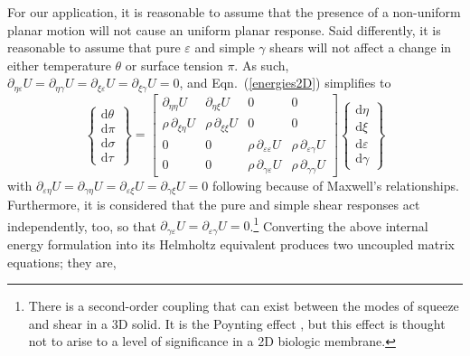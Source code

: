 For our application, it is reasonable to assume that the presence of a non-uniform planar motion will not cause an uniform planar response.  Said differently, it is reasonable to assume that pure $\varepsilon$ and simple $\gamma$ shears will not affect a change in either temperature $\theta$ or surface tension $\pi$.  As such, $\partial_{\eta\varepsilon} U = \partial_{\eta\gamma} U = \partial_{\xi\varepsilon} U = \partial_{\xi\gamma} U = 0$, and Eqn.~(\ref{energies2D}) simplifies to
\begin{displaymath}
\left\{ \begin{matrix}
\mathrm{d} \theta \\ \mathrm{d} \pi \\
\mathrm{d} \sigma \\ \mathrm{d} \tau
\end{matrix} \right\} = \begin{bmatrix}
\partial_{\eta\eta} U & 
\partial_{\eta\xi} U & 
0 & 0 \\ 
\rho \, \partial_{\xi\eta} U & 
\rho \, \partial_{\xi\xi} U & 
0 & 0 \\
0 & 0 & 
\rho \, \partial_{\varepsilon\varepsilon} U & 
\rho \, \partial_{\varepsilon\gamma} U \\
0 & 0 & 
\rho \, \partial_{\gamma\varepsilon} U & 
\rho \, \partial_{\gamma\gamma} U 
\end{bmatrix} 
\left\{ \begin{matrix}
\mathrm{d}\eta \\ \mathrm{d} \xi \\
\mathrm{d} \varepsilon \\ \mathrm{d} \gamma
\end{matrix} \right\} 
\end{displaymath}
with $\partial_{\varepsilon\eta} U = \partial_{\gamma\eta} U = \partial_{\varepsilon\xi} U = \partial_{\gamma\xi} U = 0$ following because of Maxwell's relationships.  Furthermore, it is considered that the pure and simple shear responses act independently, too, so that $\partial_{\gamma\varepsilon} U = \partial_{\varepsilon\gamma} U = 0$.\footnote{
    There is a second-order coupling that can exist between the modes of squeeze and shear in a 3D solid.  It is the Poynting effect \cite{FreedZamani19}, but this effect is thought not to arise to a level of significance in a 2D biologic membrane.
}
Converting the above internal energy formulation into its Helmholtz equivalent produces two uncoupled matrix equations; they are,
